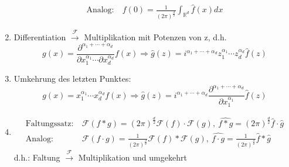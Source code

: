 \documentclass[ngerman]{article}
\theoremstyle{plain}
\theoremstyle{definition}
\numberwithin{equation}{section}
\newcommand{\R}[0] {
\mathbb R
}
\begin{document}
\begin{enumerate}[label = \roman *)]
\begin{align*}
            \text{Analog:} \ & \displaystyle f(0) = \frac{1}{(2 \pi )^\frac{d}{2}} \int_{\R^d} \hat f(x) dx
        \end{align*}
        \item Differentiation $\overset{\mathcal F}{\to}$ Multiplikation mit Potenzen von z, d.h.
        \begin{equation*}
            g(x) = \frac{\partial^{\alpha_1 + \cdots + \alpha_d}}{\partial x_1^{\alpha_1} \cdots \partial x_d^{\alpha_d}} f(x) \Rightarrow \hat g(z) = i^{\alpha_1 + \cdots + \alpha_d} z_1^{\alpha_1} \cdots z_d^{\alpha_d} \hat f(z)
        \end{equation*}
        \item Umkehrung des letzten Punktes:
        \begin{equation*}
            g(x) = x_1^{\alpha_1} \cdots x_d^{\alpha_d} f(x) \Rightarrow \hat g(z) = i^{\alpha_1 + \cdots + \alpha_d}  \frac{\partial^{\alpha_1 + \cdots + \alpha_d}}{\partial x_1^{\alpha_1}} \hat f(z)
        \end{equation*}
        \item
        \begin{align*}
            \text{Faltungssatz:} \  & \mathcal F(f*g) = (2 \pi)^{\frac{d}{2}} \mathcal F(f) \cdot \mathcal F(g), \ \widehat{f*g}=(2 \pi)^{\frac{d}{2}} \hat f \cdot \hat g\\
            \text{Analog:} \ & \mathcal F (f \cdot g) = \frac{1}{(2 \pi)^{\frac{d}{2}}} \mathcal F(f) * \mathcal F(g), \ \widehat{f \cdot g} = \frac{1}{(2\pi)^{\frac{d}{2}}} \hat f * \hat g
        \end{align*}
        d.h.: Faltung $\overset{\mathcal F}{\to}$ Multiplikation und umgekehrt
    \end{enumerate}
\end{document}
